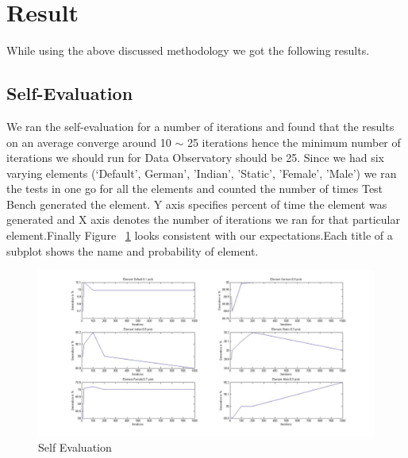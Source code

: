\documentclass[fleqn,12pt]{SelfArx} %
\begin{document}
\section{Result} \label{result}
While using the above discussed methodology we got the following results.
\subsection{Self-Evaluation}
We ran the self-evaluation for a number of iterations and found that the results on an average converge around 10 $\sim$ 25 iterations hence the minimum number of iterations we should run for Data Observatory should be 25. Since we had six varying elements (‘Default’, German’, ’Indian’, ’Static’, ’Female’, ’Male’) we ran the tests in one go for all the elements and counted the number of times Test Bench generated the element.  Y axis specifies percent of time the element was generated and  X axis denotes the number of iterations we ran for that particular element.Finally Figure ~\ref{fig:Evaluation Results of Probability Generator} looks consistent with our expectations.Each title of a subplot shows the name and probability of element.
\begin{figure}[h!]
	\includegraphics[width=\linewidth]{self_evaluation_results.jpg}
    \caption{Self Evaluation}
    \label{fig:Evaluation Results of Probability Generator}
\end{figure}
\end{document}
